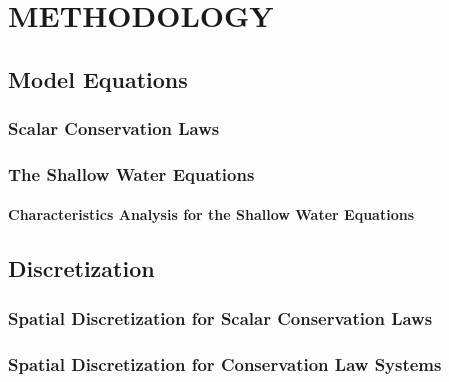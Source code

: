 \chapter{METHODOLOGY}


\section{Model Equations}\label{sec:model_equations}
%  
\subsection{Scalar Conservation Laws\label{sec:scalar}}
  
\subsection{The Shallow Water Equations\label{sec:shallowwater}}
  
  \subsubsection{Characteristics Analysis for the Shallow Water Equations
    \label{sec:shallowwater_characteristics}}
    
\section{Discretization}\label{sec:discretization}
\subsection{Spatial Discretization for Scalar Conservation Laws
  \label{sec:spatial_discretization_scalar}}
  
\subsection{Spatial Discretization for Conservation Law Systems
  \label{sec:spatial_discretization_system}}
  
